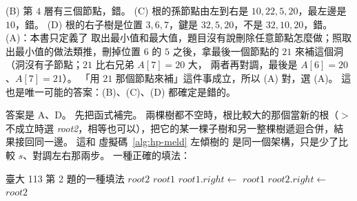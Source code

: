 (B) 第 $4$ 層有三個節點，錯。 (C) 根的孫節點由左到右是 $10, 22, 5, 20$，最左邊是 $10$，錯。
(D) 根的右子樹是位置 $3, 6, 7$，鍵是 $32, 5, 20$，不是 $32, 10, 20$，錯。 (A)：本書只定義了
取出最小值和最大值，題目沒有說刪除任意節點怎麼做；照取出最小值的做法類推，刪掉位置 $6$
的 $5$ 之後，拿最後一個節點的 $21$ 來補這個洞（洞沒有子節點；$21$ 比右兄弟 $A[7] = 20$ 大，
兩者再對調，最後是 $A[6] = 20$、$A[7] = 21$）。 「用 $21$ 那個節點來補」這件事成立，所以 (A)
對，選 (A)。 這也是唯一可能的答案：(B)、(C)、(D) 都確定是錯的。

\begin{center}

\end{center}

答案是 A、D。 先把函式補完。 兩棵樹都不空時，根比較大的那個當新的根（$>$ 不成立時選
\emph{root2}，相等也可以），把它的某一棵子樹和另一整棵樹遞迴合併，結果接回同一邊。 這和
虛擬碼~\ref{alg:hp-meld} 左傾樹的  是同一個架構，只是少了比較 $s$、對調左右那兩步。
一種正確的填法：

\begin{pseudo}[unbreakable]{臺大 113 第 2 題的一種填法}
     \Return $\mathit{root2}$  \EndIf
     \Return $\mathit{root1}$  \EndIf
        \State $\mathit{root1}.\mathit{right} \gets$  
        \State \Return $\mathit{root1}$ 
    \Else
        \State $\mathit{root2}.\mathit{right} \gets$  
        \State \Return $\mathit{root2}$ 
    \EndIf
\EndFunction
\end{pseudo}

